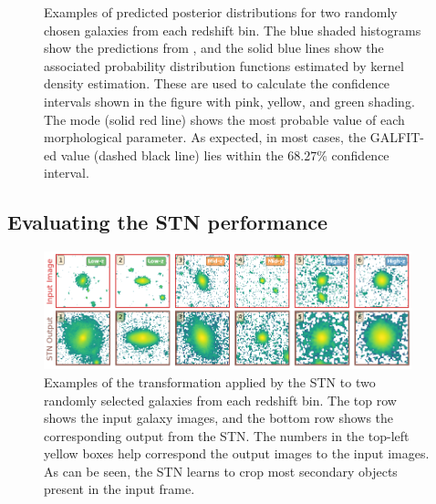 \begin{figure}[]
    \begin{center}
  \end{center}
  \caption{Examples of predicted posterior distributions for two randomly chosen galaxies from each redshift bin. The blue shaded histograms show the predictions from \gampen{}, and the solid blue lines show the associated probability distribution functions estimated by kernel density estimation. These are used to calculate the confidence intervals shown in the figure with pink, yellow, and green shading. The mode (solid red line) shows the most probable value of each morphological parameter. As expected, in most cases, the GALFIT-ed value (dashed black line) lies within the $68.27\%$ confidence interval.}
  \label{fig_c3:example_pred_dists}
\end{figure}


\subsection{Evaluating the STN performance} \label{sec_c3:stn_performance}

\begin{figure}[htb]
    \centering
    \includegraphics[width = 0.95\textwidth]{stn_random.png}
    \caption{Examples of the transformation applied by the STN to two randomly selected galaxies from each redshift bin. The top row shows the input galaxy images, and the bottom row shows the corresponding output from the STN. The numbers in the top-left yellow boxes help correspond the output images to the input images. As can be seen, the STN learns to crop most secondary objects present in the input frame.}
    \label{fig_c3:stn_random}
\end{figure}

